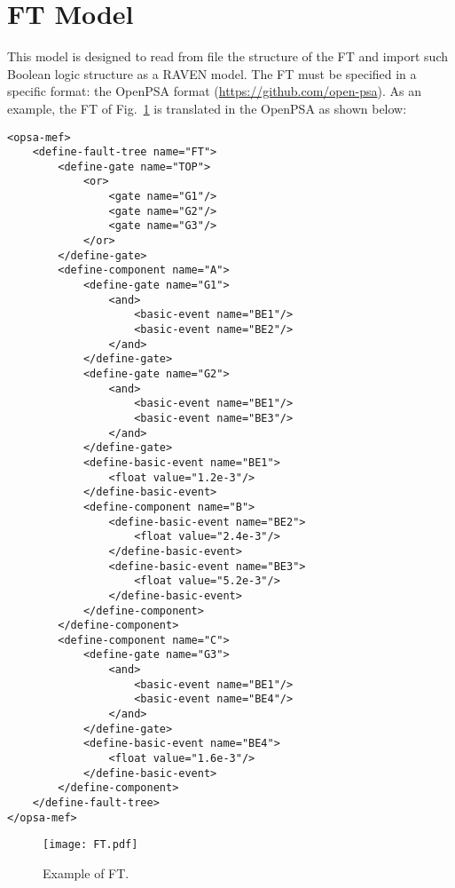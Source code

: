 \section{FT Model}
\label{sec:FTmodel}

This model is designed to read from file the structure of the FT and import such Boolean logic structure as a RAVEN model.
The FT must be specified in a specific format: the OpenPSA format (\href{<url>}{https://github.com/open-psa}). 
As an example, the FT of Fig.~\ref{fig:FT} is translated in the OpenPSA as shown below:

\begin{lstlisting}[style=XML,morekeywords={anAttribute},caption=FTmodel input example., label=lst:FTmodel]
<opsa-mef>
    <define-fault-tree name="FT">
        <define-gate name="TOP">
            <or>
                <gate name="G1"/>
                <gate name="G2"/>
                <gate name="G3"/>
            </or>
        </define-gate>
        <define-component name="A">
            <define-gate name="G1">
                <and>
                    <basic-event name="BE1"/>
                    <basic-event name="BE2"/>
                </and>
            </define-gate>
            <define-gate name="G2">
                <and>
                    <basic-event name="BE1"/>
                    <basic-event name="BE3"/>
                </and>
            </define-gate>
            <define-basic-event name="BE1">
                <float value="1.2e-3"/>
            </define-basic-event>
            <define-component name="B">
                <define-basic-event name="BE2">
                    <float value="2.4e-3"/>
                </define-basic-event>
                <define-basic-event name="BE3">
                    <float value="5.2e-3"/>
                </define-basic-event>
            </define-component>
        </define-component>
        <define-component name="C">
            <define-gate name="G3">
                <and>
                    <basic-event name="BE1"/>
                    <basic-event name="BE4"/>
                </and>
            </define-gate>
            <define-basic-event name="BE4">
                <float value="1.6e-3"/>
            </define-basic-event>
        </define-component>
    </define-fault-tree>
</opsa-mef>
\end{lstlisting} 

\begin{figure}
    \centering
    \centerline{\texttt{[image: FT.pdf]}} 
    \caption{Example of FT.}
    \label{fig:FT}
\end{figure}

